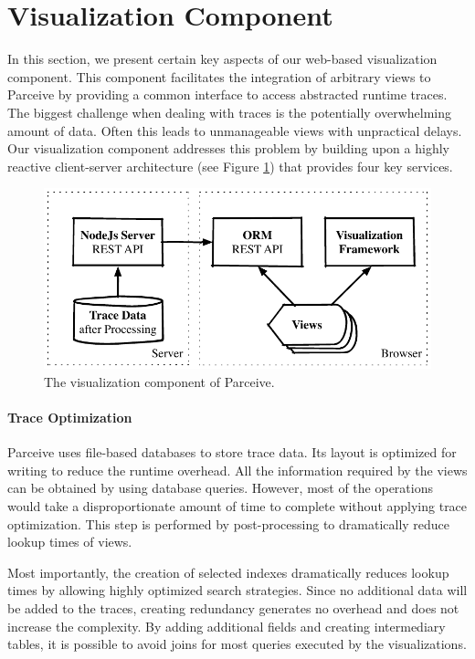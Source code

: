 \section{Visualization Component}
In this section, we present certain key aspects of our web-based visualization
component. This component facilitates the integration of arbitrary views to
Parceive by providing a common interface to access abstracted runtime traces.
The biggest challenge when dealing with traces is the potentially overwhelming
amount of data. Often this leads to unmanageable views with unpractical delays.
Our visualization component addresses this problem by building upon a highly
reactive client-server architecture (see Figure \ref{fig:visualization}) that
provides four key services.

\begin{figure}[h!]
\includegraphics[width=\linewidth]{img/visualization_framework}
\caption{The visualization component of Parceive.}
\label{fig:visualization}
\end{figure}

\paragraph{Trace Optimization}
Parceive uses file-based databases to store trace data. Its
layout is optimized for writing to reduce the runtime overhead. All the
information required by the views can be obtained by using database queries.
However, most of the operations would take a disproportionate amount of time to
complete without applying trace optimization. This step is performed by
post-processing to dramatically reduce lookup times of views.   

Most importantly, the creation of selected indexes dramatically reduces lookup
times by allowing highly optimized search strategies. Since no additional data
will be added to the traces, creating redundancy generates no overhead and does
not increase the complexity. By adding additional fields and creating
intermediary tables, it is possible to avoid joins for most queries executed by
the visualizations. 

